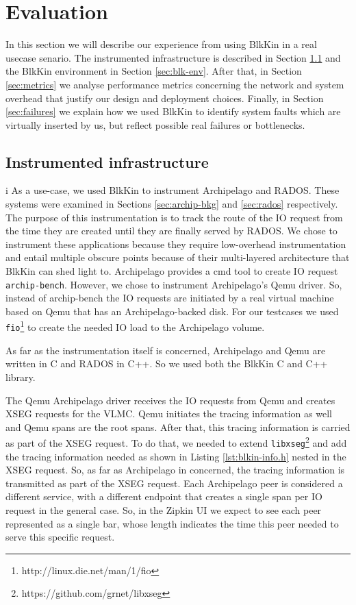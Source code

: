 \chapter{Evaluation}\label{ch:evaluation}

In this section we will describe our experience from using BlkKin in a real
usecase senario. The instrumented infrastructure is described in Section
\ref{sec:infra} and the BlkKin environment in Section \ref{sec:blk-env}. After
that, in Section \ref{sec:metrics} we analyse performance metrics concerning
the network and system overhead that justify our design and deployment choices.
Finally, in Section \ref{sec:failures} we explain how we used BlkKin to
identify system faults which are virtually inserted by us, but reflect possible
real failures or bottlenecks. 


\section{Instrumented infrastructure}\label{sec:infra} i
As a use-case, we used BlkKin to instrument Archipelago and RADOS. These systems
were examined in Sections \ref{sec:archip-bkg} and \ref{sec:rados} respectively.
The purpose of this instrumentation is to track the route of the IO request from
the time they are created until they are finally served by RADOS. We chose to
instrument these applications because they require low-overhead instrumentation
and entail multiple obscure points because of their multi-layered architecture
that BlkKin can shed light to. Archipelago provides a cmd tool to create IO
request \texttt{archip-bench}. However, we chose to instrument Archipelago's
Qemu driver. So, instead of archip-bench the IO requests are initiated by a real
virtual machine based on Qemu that has an Archipelago-backed disk. For our
testcases we used \texttt{fio}\footnote{http://linux.die.net/man/1/fio} to
create the needed IO load to the Archipelago volume. 

As far as the instrumentation itself is concerned, Archipelago and Qemu are
written in C and RADOS in C++. So we used both the BlkKin C and C++ library.

The Qemu Archipelago driver receives the IO requests from Qemu and creates XSEG
requests for the VLMC. Qemu initiates the tracing information as well and Qemu
spans are the root spans. After that, this tracing information is carried as
part of the XSEG request. To do that, we needed to extend
\texttt{libxseg}\footnote{https://github.com/grnet/libxseg} and add the tracing
information needed as shown in Listing \ref{lst:blkin-info.h} nested in the XSEG
request. So, as far as Archipelago in concerned, the tracing information is
transmitted as part of the XSEG request. Each Archipelago peer is considered a
different service, with a different endpoint that creates a single span per IO
request in the general case. So, in the Zipkin UI we expect to see each peer
represented as a single bar, whose length indicates the time this peer needed to
serve this specific request.

